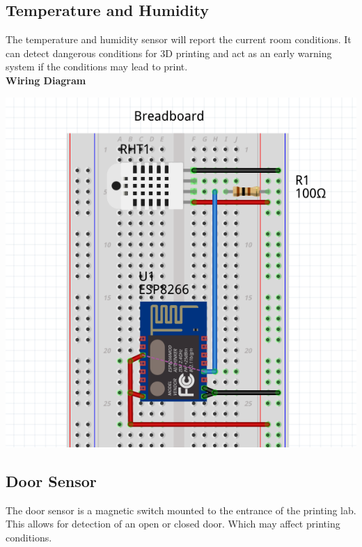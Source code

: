     \subsection{Temperature and Humidity}
      The temperature and humidity sensor will report the current room conditions. It
      can detect dangerous conditions for 3D printing and act as an early warning system
      if the conditions may lead to print.\\

      \textbf{Wiring Diagram}\\
            \begin{center}
      \includegraphics[scale=0.25]{images/temp-diagram.png}
\end{center}

    \subsection{Door Sensor}
      The door sensor is a magnetic switch mounted to the entrance of the printing lab.
      This allows for detection of an open or closed door. Which may affect printing conditions.\\

